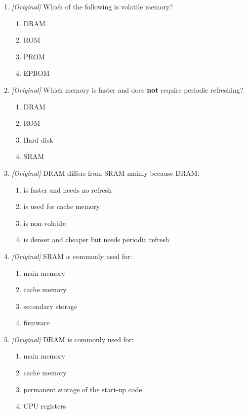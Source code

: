 \begin{enumerate}[label=\textbf{Q\arabic*.}, leftmargin=*]
\begin{enumerate}[label=\Alph*.]
    \item L1 cache
    \item the SSD
  \end{enumerate}
\item \textit{[Original]} Which of the following is volatile memory?
  \begin{enumerate}[label=\Alph*.]
    \item DRAM
    \item ROM
    \item PROM
    \item EPROM
  \end{enumerate}
\item \textit{[Original]} Which memory is faster and does \textbf{not}
  require periodic refreshing?
  \begin{enumerate}[label=\Alph*.]
    \item DRAM
    \item ROM
    \item Hard disk
    \item SRAM
  \end{enumerate}
\item \textit{[Original]} DRAM differs from SRAM mainly because DRAM:
  \begin{enumerate}[label=\Alph*.]
    \item is faster and needs no refresh
    \item is used for cache memory
    \item is non-volatile
    \item is denser and cheaper but needs periodic refresh
  \end{enumerate}
\item \textit{[Original]} SRAM is commonly used for:
  \begin{enumerate}[label=\Alph*.]
    \item main memory
    \item cache memory
    \item secondary storage
    \item firmware
  \end{enumerate}
\item \textit{[Original]} DRAM is commonly used for:
  \begin{enumerate}[label=\Alph*.]
    \item main memory
    \item cache memory
    \item permanent storage of the start-up code
    \item CPU registers

\end{enumerate}
\end{enumerate}

